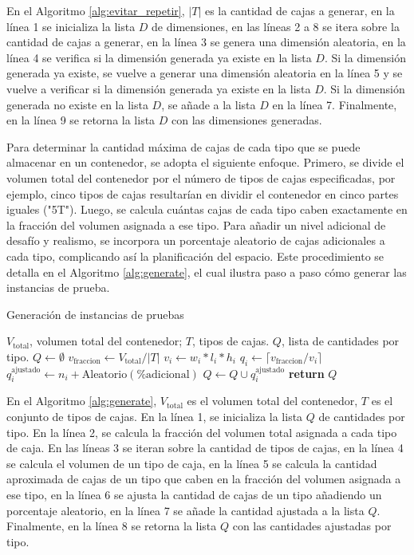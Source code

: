 En el Algoritmo \ref{alg:evitar_repetir}, $|T|$ es la cantidad de cajas a generar, en la línea 1 se inicializa la lista $D$ de dimensiones, en las líneas 2 a 8 se itera sobre la cantidad de cajas a generar, en la línea 3 se genera una dimensión aleatoria, en la línea 4 se verifica si la dimensión generada ya existe en la lista $D$. Si la dimensión generada ya existe, se vuelve a generar una dimensión aleatoria en la línea 5 y se vuelve a verificar si la dimensión generada ya existe en la lista $D$. Si la dimensión generada no existe en la lista $D$, se añade a la lista $D$ en la línea 7. Finalmente, en la línea 9 se retorna la lista $D$ con las dimensiones generadas.

Para determinar la cantidad máxima de cajas de cada tipo que se puede almacenar en un contenedor, se adopta el siguiente enfoque. Primero, se divide el volumen total del contenedor por el número de tipos de cajas especificadas, por ejemplo, cinco tipos de cajas resultarían en dividir el contenedor en cinco partes iguales ("5T"). Luego, se calcula cuántas cajas de cada tipo caben exactamente en la fracción del volumen asignada a ese tipo. Para añadir un nivel adicional de desafío y realismo, se incorpora un porcentaje aleatorio de cajas adicionales a cada tipo, complicando así la planificación del espacio. Este procedimiento se detalla en el Algoritmo \ref{alg:generate}, el cual ilustra paso a paso cómo generar las instancias de prueba.

\begin{algorithm}[H]
    \caption{Generación de instancias de pruebas}
    \label{alg:generate}
    \begin{algorithmic}[1]
        \Require $V_{\text{total}}$, volumen total del contenedor; $T$, tipos de cajas.
        \Ensure $Q$, lista de cantidades por tipo.
        \State $Q \gets \emptyset$
        \State $v_{\text{fraccion}} \gets V_{\text{total}} / |T|$ 
        \State $v_i \gets w_i*l_i*h_i$ 
        \State $q_i \gets \lceil v_{\text{fraccion}} / v_i \rceil $
        \State $q_i^{\text{ajustado}} \gets n_i + \text{Aleatorio}(\% \text{adicional})$ 
        \State $Q \gets Q \cup q_i^{\text{ajustado}}$
        \EndFor
        \State \textbf{return} $Q$
    \end{algorithmic}
\end{algorithm}

En el Algoritmo \ref{alg:generate}, $V_{\text{total}}$ es el volumen total del contenedor, $T$ es el conjunto de tipos de cajas. En la línea 1, se inicializa la lista $Q$ de cantidades por tipo. En la línea 2, se calcula la fracción del volumen total asignada a cada tipo de caja. En las líneas 3 se iteran sobre la cantidad de tipos de cajas, en la línea 4 se calcula el volumen de un tipo de caja, en la línea 5 se calcula la cantidad aproximada de cajas de un tipo que caben en la fracción del volumen asignada a ese tipo, en la línea 6 se ajusta la cantidad de cajas de un tipo añadiendo un porcentaje aleatorio, en la línea 7 se añade la cantidad ajustada a la lista $Q$. Finalmente, en la línea 8 se retorna la lista $Q$ con las cantidades ajustadas por tipo.

